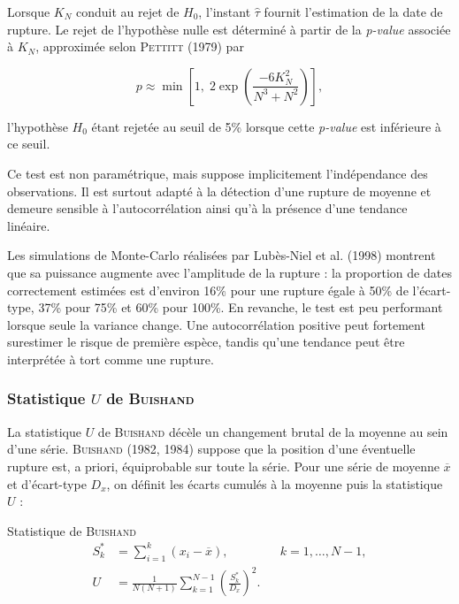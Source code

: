 \documentclass[12pt,a4paper]{report}
\begin{document}
Lorsque $K_N$ conduit au rejet de $H_0$, l'instant $\widehat{\tau}$ fournit l'estimation de la date de rupture. Le rejet de l'hypothèse nulle est déterminé à partir de la \textit{p-value} associée à $K_N$, approximée selon \textsc{Pettitt} (1979) par

\[
p \approx \min\left[1,\; 2\exp\left(\frac{-6K_N^2}{N^3+N^2}\right)\right],
\]

l'hypothèse $H_0$ étant rejetée au seuil de 5\% lorsque cette \textit{p-value} est inférieure à ce seuil.

Ce test est non paramétrique, mais suppose implicitement l'indépendance des observations. Il est surtout adapté à la détection d'une rupture de moyenne et demeure sensible à l'autocorrélation ainsi qu'à la présence d'une tendance linéaire.

Les simulations de Monte-Carlo réalisées par Lubès-Niel et al. (1998) montrent que sa puissance augmente avec l'amplitude de la rupture : la proportion de dates correctement estimées est d'environ 16\% pour une rupture égale à 50\% de l'écart-type, 37\% pour 75\% et 60\% pour 100\%. En revanche, le test est peu performant lorsque seule la variance change. Une autocorrélation positive peut fortement surestimer le risque de première espèce, tandis qu'une tendance peut être interprétée à tort comme une rupture.

\subsubsection{Statistique \texorpdfstring{$U$}{U} de \textsc{Buishand}}

La statistique $U$ de \textsc{Buishand} décèle un changement brutal de la moyenne au sein d'une série. \textsc{Buishand} (1982, 1984) suppose que la position d'une éventuelle rupture est, a priori, équiprobable sur toute la série. Pour une série de moyenne $\overline{x}$ et d'écart-type $D_x$, on définit les écarts cumulés à la moyenne puis la statistique $U$ :

\begin{formulabox}{Statistique de \textsc{Buishand}}
\begin{align}
S_k^{*} &= \sum_{i=1}^{k}\left(x_i-\overline{x}\right),
&& k=1,\ldots,N-1,
\label{eq:buishand-sk}\\[2mm]
U &= \frac{1}{N(N+1)}
\sum_{k=1}^{N-1}\left(\frac{S_k^{*}}{D_x}\right)^2.
\label{eq:buishand-u}
\end{align}
\end{formulabox}
\end{document}
